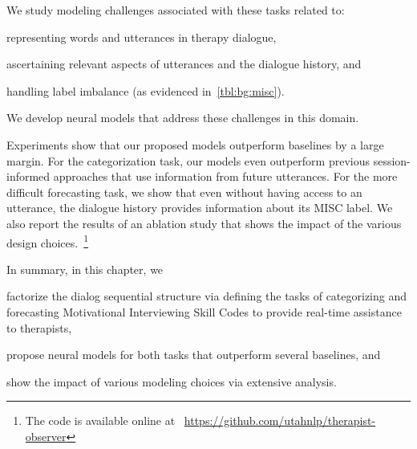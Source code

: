 We study modeling challenges associated with these tasks related to:
\begin{inparaenum}[(1)]
\item representing words and utterances in therapy dialogue,
\item ascertaining relevant aspects of utterances and the dialogue
  history, and
\item handling label imbalance (as evidenced in~\autoref{tbl:bg:misc}).
\end{inparaenum}
We develop neural models that address these challenges in this
domain.

Experiments show that our proposed models outperform baselines by a
large margin. For the categorization task, our models even outperform
previous session-informed approaches that use information from future
utterances. For the more difficult forecasting task, we show that even
without having access to an utterance, the dialogue history provides
information about its MISC label.  We also report the results of an
ablation study that shows the impact of the various design
choices.~\footnote{The code is available online at
  ~\url{https://github.com/utahnlp/therapist-observer}}

In summary, in this chapter, we
\begin{inparaenum}[(1)]
\item factorize the dialog sequential structure via defining the tasks
  of categorizing and forecasting Motivational Interviewing Skill
  Codes to provide real-time assistance to therapists,
\item propose neural models for both tasks that outperform several
  baselines, and
\item show the impact of various modeling choices via extensive
  analysis.
\end{inparaenum}















